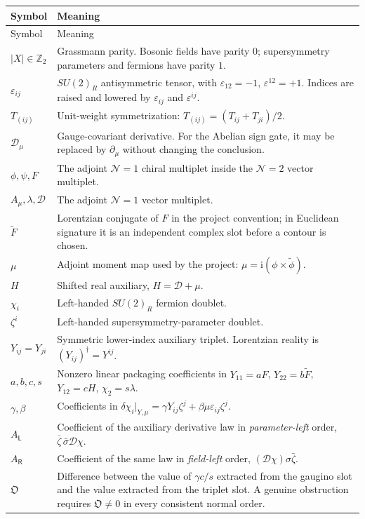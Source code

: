 \documentclass[11pt,a4paper,UTF8]{ctexart}
\numberwithin{equation}{section}
\newcommand{\ii}{\mathrm i}
\newcommand{\cD}{\mathcal D}
\newcommand{\eps}{\varepsilon}
\newcommand{\N}{\mathcal N}
\newcommand{\PL}{\mathsf L}
\newcommand{\PR}{\mathsf R}
\newcommand{\parity}[1]{\lvert #1\rvert}
\newcommand{\slot}{\big\vert}
\begin{document}
\begin{longtable}{>{\raggedright\arraybackslash}p{}>{\raggedright\arraybackslash}p{}}
\toprule
Symbol & Meaning \\
\midrule
\endfirsthead
\toprule
Symbol & Meaning \\
\midrule
\endhead
$\parity{X}\in\mathbb Z_2$ & Grassmann parity. Bosonic fields have parity $0$; supersymmetry parameters and fermions have parity $1$. \\
$\eps_{ij}$ & $SU(2)_R$ antisymmetric tensor, with $\eps_{12}=-1$, $\eps^{12}=+1$. Indices are raised and lowered by $\eps_{ij}$ and $\eps^{ij}$. \\
$T_{(ij)}$ & Unit-weight symmetrization: $T_{(ij)}=(T_{ij}+T_{ji})/2$. \\
$\cD_\mu$ & Gauge-covariant derivative. For the Abelian sign gate, it may be replaced by $\partial_\mu$ without changing the conclusion. \\
$\phi,\psi,F$ & The adjoint $\N=1$ chiral multiplet inside the $\N=2$ vector multiplet. \\
$A_\mu,\lambda,\mathscr D$ & The adjoint $\N=1$ vector multiplet. \\
$\widetilde F$ & Lorentzian conjugate of $F$ in the project convention; in Euclidean signature it is an independent complex slot before a contour is chosen. \\
$\mu$ & Adjoint moment map used by the project: $\mu=\ii(\phi\times\widetilde\phi)$. \\
$H$ & Shifted real auxiliary, $H=\mathscr D+\mu$. \\
$\chi_i$ & Left-handed $SU(2)_R$ fermion doublet. \\
$\zeta^i$ & Left-handed supersymmetry-parameter doublet. \\
$Y_{ij}=Y_{ji}$ & Symmetric lower-index auxiliary triplet. Lorentzian reality is $(Y_{ij})^\dagger=Y^{ij}$. \\
$a,b,c,s$ & Nonzero linear packaging coefficients in $Y_{11}=aF$, $Y_{22}=b\widetilde F$, $Y_{12}=cH$, $\chi_2=s\lambda$. \\
$\gamma,\beta$ & Coefficients in $\delta\chi_i\slot_{Y,\mu}=\gamma Y_{ij}\zeta^j+\beta\mu\eps_{ij}\zeta^j$. \\
$A_{\PL}$ & Coefficient of the auxiliary derivative law in \emph{parameter-left} order, $\bar\zeta\,\bar\sigma\cD\chi$. \\
$A_{\PR}$ & Coefficient of the same law in \emph{field-left} order, $(\cD\chi)\sigma\bar\zeta$. \\
$\mathfrak O$ & Difference between the value of $\gamma c/s$ extracted from the gaugino slot and the value extracted from the triplet slot. A genuine obstruction requires $\mathfrak O\neq0$ in every consistent normal order. \\
\bottomrule
\end{longtable}
\end{document}
